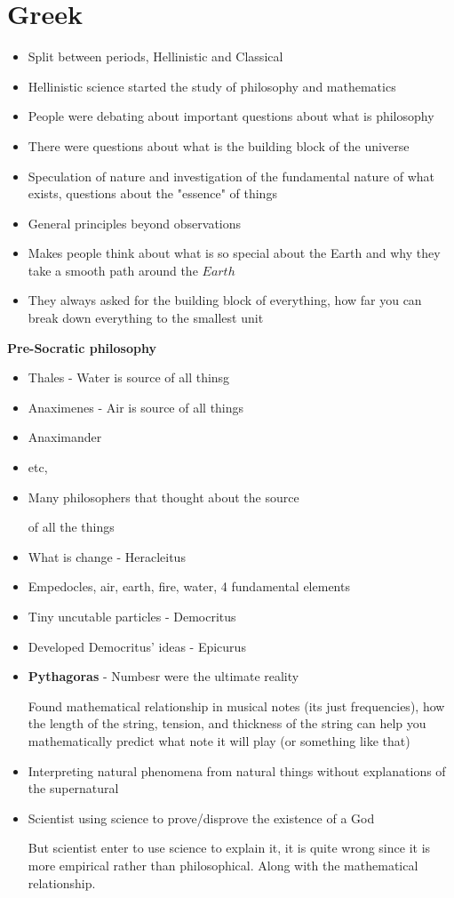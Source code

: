 \documentclass{article}
\begin{document}
\section{Greek}
\begin{itemize}
  \item Split between periods, Hellinistic and Classical
  \item Hellinistic science started the study of philosophy and mathematics
  \item People were debating about important questions about what is philosophy
  \item There were questions about what is the building block of the universe
  \item Speculation of nature and investigation
    of the fundamental nature of what exists, questions about
    the "essence" of things
  \item General principles beyond observations
  \item Makes people think about what is so special about the Earth and why they take a smooth
    path around the $Earth$
  \item They always asked for the building block of everything, how far you can break down
    everything to the smallest unit
\end{itemize}

\textbf{Pre-Socratic philosophy}
    \begin{itemize}
      \item  Thales - Water is source of all thinsg
      \item Anaximenes - Air is source of all things
      \item Anaximander
      \item etc,
      \item Many philosophers that thought about the source

        of all the things
      \item What is change - Heracleitus
      \item Empedocles, air, earth, fire, water, 4 fundamental elements
      \item Tiny uncutable particles - Democritus
      \item Developed Democritus' ideas - Epicurus
      \item \textbf{Pythagoras} - Numbesr were the ultimate reality

        Found mathematical relationship in musical notes (its just frequencies),
        how the length of the string, tension, and thickness of the string can help you
        mathematically predict what note it will play (or something like that)
      \item Interpreting natural phenomena from natural
        things without explanations of the supernatural
      \item Scientist using science to prove/disprove the existence of a God

       But scientist enter to use science to explain it, it is quite wrong
       since it is more empirical rather than philosophical. Along with
       the mathematical relationship.
    \end{itemize}
\end{document}
